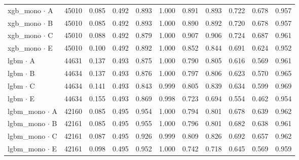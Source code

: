 \begin{tabular}{lllllllllll}
xgb\_mono $\cdot$ A & 45010 & 0.085 & 0.492 & 0.893 & 1.000 & 0.891 & 0.893 & 0.722 & 0.678 & 0.957 \\
xgb\_mono $\cdot$ B & 45010 & 0.085 & 0.492 & 0.893 & 1.000 & 0.890 & 0.892 & 0.720 & 0.678 & 0.957 \\
xgb\_mono $\cdot$ C & 45010 & 0.088 & 0.492 & 0.879 & 1.000 & 0.907 & 0.906 & 0.724 & 0.687 & 0.961 \\
xgb\_mono $\cdot$ E & 45010 & 0.100 & 0.492 & 0.892 & 1.000 & 0.852 & 0.844 & 0.691 & 0.624 & 0.952 \\
lgbm $\cdot$ A & 44631 & 0.137 & 0.493 & 0.875 & 1.000 & 0.790 & 0.805 & 0.616 & 0.569 & 0.961 \\
lgbm $\cdot$ B & 44634 & 0.137 & 0.493 & 0.876 & 1.000 & 0.797 & 0.806 & 0.623 & 0.570 & 0.965 \\
lgbm $\cdot$ C & 44634 & 0.141 & 0.493 & 0.843 & 0.999 & 0.805 & 0.839 & 0.634 & 0.599 & 0.969 \\
lgbm $\cdot$ E & 44634 & 0.155 & 0.493 & 0.869 & 0.998 & 0.723 & 0.694 & 0.554 & 0.462 & 0.954 \\
lgbm\_mono $\cdot$ A & 42160 & 0.085 & 0.495 & 0.954 & 1.000 & 0.794 & 0.801 & 0.678 & 0.639 & 0.962 \\
lgbm\_mono $\cdot$ B & 42161 & 0.085 & 0.495 & 0.955 & 1.000 & 0.796 & 0.801 & 0.682 & 0.638 & 0.961 \\
lgbm\_mono $\cdot$ C & 42161 & 0.087 & 0.495 & 0.926 & 0.999 & 0.809 & 0.826 & 0.692 & 0.657 & 0.962 \\
lgbm\_mono $\cdot$ E & 42161 & 0.098 & 0.495 & 0.952 & 1.000 & 0.742 & 0.718 & 0.645 & 0.569 & 0.959 \\
\hline
\end{tabular}
